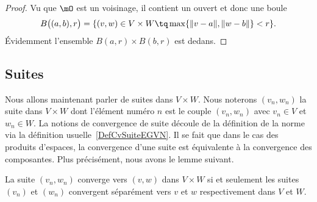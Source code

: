 \begin{proof}
    Vu que \( \mO\) est un voisinage, il contient un ouvert et donc une boule
    \begin{equation}
        B\big( (a,b),r \big)=\{ (v,w)\in V\times W\tq \max\{ \| v-a \|,\| w-b \| \}< r \}.
    \end{equation}
    Évidemment l'ensemble \( B(a,r)\times B(b,r)\) est dedans.
\end{proof}

\subsection{Suites}

Nous allons maintenant parler de suites dans $V\times W$. Nous noterons $(v_n,w_n)$ la suite dans $V\times W$ dont l'élément numéro $n$ est le couple $(v_n,w_n)$ avec $v_n\in V$ et $w_n\in W$. La notions de convergence de suite découle de la définition de la norme via la définition usuelle~\ref{DefCvSuiteEGVN}. Il se fait que dans le cas des produits d'espaces, la convergence d'une suite est équivalente à la convergence des composantes. Plus précisément, nous avons le lemme suivant.
\begin{lemma}		\label{LemCvVxWcvVW}
	La suite $(v_n,w_n)$ converge vers $(v,w)$ dans $V\times W$ si et seulement les suites $(v_n)$ et $(w_n)$ convergent séparément vers $v$ et $w$ respectivement dans $V$ et $W$.
\end{lemma}

